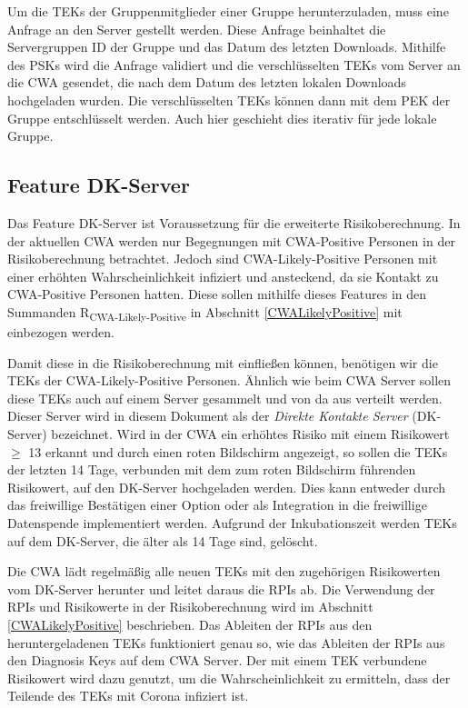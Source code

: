 \documentclass[conference,compsoc]{IEEEtran}
\begin{document}
Um die TEKs der Gruppenmitglieder einer Gruppe herunterzuladen, muss eine Anfrage an den Server gestellt werden.
Diese Anfrage beinhaltet die Servergruppen ID der Gruppe und das Datum des letzten Downloads.
Mithilfe des PSKs wird die Anfrage validiert und die verschlüsselten TEKs vom Server an die CWA gesendet, die nach dem Datum des letzten lokalen Downloads hochgeladen wurden.
Die verschlüsselten TEKs können dann mit dem PEK der Gruppe entschlüsselt werden.
Auch hier geschieht dies iterativ für jede lokale Gruppe.\\

\subsection{Feature DK-Server}
\label{DK-Server}

Das Feature DK-Server ist Voraussetzung für die erweiterte Risikoberechnung.
In der aktuellen CWA werden nur Begegnungen mit CWA-Positive Personen in der Risikoberechnung betrachtet.
Jedoch sind CWA-Likely-Positive Personen mit einer erhöhten Wahrscheinlichkeit infiziert und ansteckend, da sie Kontakt zu CWA-Positive Personen hatten.
Diese sollen mithilfe dieses Features in den Summanden R\textsubscript{CWA-Likely-Positive} in Abschnitt \ref{CWALikelyPositive} mit einbezogen werden.

Damit diese in die Risikoberechnung mit einfließen können, benötigen wir die TEKs der CWA-Likely-Positive Personen.
Ähnlich wie beim CWA Server sollen diese TEKs auch auf einem Server gesammelt und von da aus verteilt werden.
Dieser Server wird in diesem Dokument als der \textit{Direkte Kontakte Server} (DK-Server) bezeichnet.
Wird in der CWA ein erhöhtes Risiko mit einem Risikowert $\geq$ 13 erkannt und durch einen roten Bildschirm angezeigt, 
so sollen die TEKs der letzten 14 Tage, verbunden mit dem zum roten Bildschirm führenden Risikowert, auf den DK-Server hochgeladen werden.
Dies kann entweder durch das freiwillige Bestätigen einer Option oder als Integration in die freiwillige Datenspende implementiert werden.
Aufgrund der Inkubationszeit werden TEKs auf dem DK-Server, die älter als 14 Tage sind, gelöscht.

Die CWA lädt regelmäßig alle neuen TEKs mit den zugehörigen Risikowerten vom DK-Server herunter und leitet daraus die RPIs ab.
Die Verwendung der RPIs und Risikowerte in der Risikoberechnung wird im Abschnitt \ref{CWALikelyPositive} beschrieben.
Das Ableiten der RPIs aus den heruntergeladenen TEKs funktioniert genau so, wie das Ableiten der RPIs aus den Diagnosis Keys auf dem CWA Server.
Der mit einem TEK verbundene Risikowert wird dazu genutzt, um die Wahrscheinlichkeit zu ermitteln, dass der Teilende des TEKs mit Corona infiziert ist.
\end{document}
